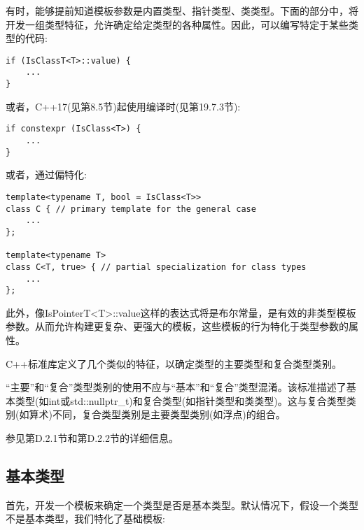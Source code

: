 
有时，能够提前知道模板参数是内置类型、指针类型、类类型。下面的部分中，将开发一组类型特征，允许确定给定类型的各种属性。因此，可以编写特定于某些类型的代码:

\begin{lstlisting}[style=styleCXX]
if (IsClassT<T>::value) {
	...
}
\end{lstlisting}

或者，C++17(见第8.5节)起使用编译时(见第19.7.3节):

\begin{lstlisting}[style=styleCXX]
if constexpr (IsClass<T>) {
	...
}
\end{lstlisting}

或者，通过偏特化:

\begin{lstlisting}[style=styleCXX]
template<typename T, bool = IsClass<T>>
class C { // primary template for the general case
	...
};

template<typename T>
class C<T, true> { // partial specialization for class types
	...
};
\end{lstlisting}

此外，像IsPointerT<T>::value这样的表达式将是布尔常量，是有效的非类型模板参数。从而允许构建更复杂、更强大的模板，这些模板的行为特化于类型参数的属性。

C++标准库定义了几个类似的特征，以确定类型的主要类型和复合类型类别。

\begin{tcolorbox}[colback=webgreen!5!white,colframe=webgreen!75!black]
\hspace*{0.75cm}“主要”和“复合”类型类别的使用不应与“基本”和“复合”类型混淆。该标准描述了基本类型(如int或std::nullptr\_t)和复合类型(如指针类型和类类型)。这与复合类型类别(如算术)不同，复合类型类别是主要类型类别(如浮点)的组合。
\end{tcolorbox}

参见第D.2.1节和第D.2.2节的详细信息。

\subsection{基本类型}

首先，开发一个模板来确定一个类型是否是基本类型。默认情况下，假设一个类型不是基本类型，我们特化了基础模板:

